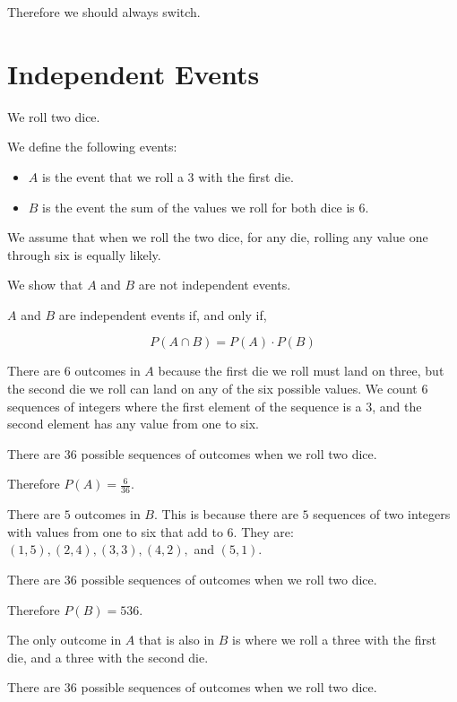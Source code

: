 \documentclass[a4paper,11pt]{article}
\begin{document}
Therefore we should always switch.

\section{Independent Events}

We roll two dice.

We define the following events:

\begin{itemize}
  \item $A$ is the event that we roll a 3 with the first die.
  \item $B$ is the event the sum of the values we roll for both dice is 6.
\end{itemize}

We assume that when we roll the two dice, for any die, rolling any
value one through six is equally likely.

We show that $A$ and $B$ are not independent events.

$A$ and $B$ are independent events if, and only if, 

\begin{equation}
  P \left( A \cap B \right) = P \left( A \right) \cdot P \left( B \right)
\end{equation}

There are 6 outcomes in $A$ because the first die we roll must land on
three, but the second die we roll can land on any of the six possible
values. We count 6 sequences of integers where the first element of
the sequence is a 3, and the second element has any value from one
to six.

There are $36$ possible sequences of outcomes when we roll two dice.

Therefore $P \left( A \right) = \frac{6}{36}$.

There are $5$ outcomes in $B$.  This is because there are $5$ sequences
of two integers with values from one to six that add to 6.  They are:
$\left(1, 5 \right), \left(2, 4 \right), \left(3, 3 \right), 
\left(4, 2 \right),$ and $\left(5, 1 \right)$.

There are $36$ possible sequences of outcomes when we roll two dice.

Therefore $P \left( B \right) = {5}{36}$.

The only outcome in $A$ that is also in $B$ is where we roll a three
with the first die, and a three with the second die.

There are $36$ possible sequences of outcomes when we roll two dice.
\end{document}
